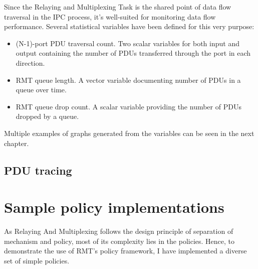             Since the Relaying and Multiplexing Task is the shared point of data flow traversal in the IPC process, it's well-suited for monitoring data flow performance. Several statistical variables have been defined for this very purpose:

            \begin{itemize}
                \item (N-1)-port PDU traversal count. Two scalar variables for both input and output containing the number of PDUs transferred through the port in each direction.
                \item RMT queue length. A vector variable documenting number of PDUs in a queue over time.
                \item RMT queue drop count. A scalar variable providing the number of PDUs dropped by a queue.
            \end{itemize}

            Multiple examples of graphs generated from the variables can be seen in the next chapter.

        \subsection{PDU tracing}

    \section{Sample policy implementations}

        As Relaying And Multiplexing follows the design principle of separation of mechanism and policy, most of its complexity lies in the policies. Hence, to demonstrate the use of RMT's policy framework, I have implemented a diverse set of simple policies.

